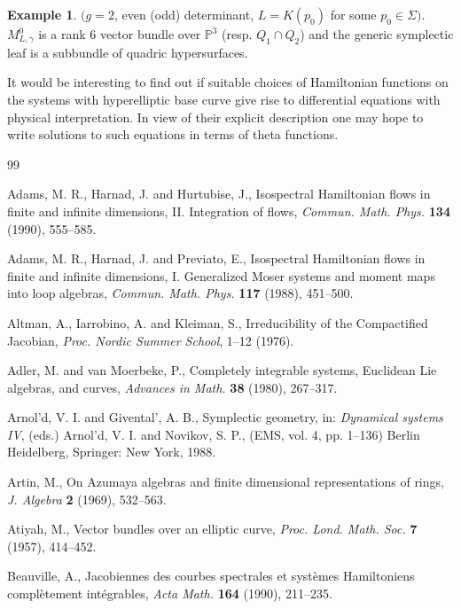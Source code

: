 \documentclass[12pt,a4paper,oneside,english]{smfart}
\theoremstyle{definition}
\newtheorem{exmp}[thm]{Example}
\theoremstyle{remark}
\begin{document}
\begin{exmp}\label{t9.16}
$(g = 2$, even (odd) determinant, $L = K(p_0)$ for some $p_0 \in \Sigma)$. $M^0_{L, \gamma}$ is a rank 6 vector bundle over $\mathbb{P}^3$ (resp. $Q_1 \cap Q_2$) and the generic symplectic leaf is a subbundle of quadric hypersurfaces.
\end{exmp}

It would be interesting to find out if suitable choices of Hamiltonian functions on the systems with hyperelliptic base curve give rise to differential equations with physical interpretation. In view of their explicit description one may hope to write solutions to such equations in terms of theta functions.

\begin{thebibliography}{99}

 Adams, M. R., Harnad, J. and Hurtubise, J., Isospectral Hamiltonian flows in finite and infinite dimensions, II. Integration of flows, \emph{Commun. Math. Phys.} \textbf{134} (1990), 555--585.

 Adams, M. R., Harnad, J. and Previato, E., Isospectral Hamiltonian flows in finite and infinite dimensions, I. Generalized Moser systems and moment maps into loop algebras, \emph{Commun. Math. Phys.} \textbf{117} (1988), 451--500.

 Altman, A., Iarrobino, A. and Kleiman, S., Irreducibility of the Compactified Jacobian, \emph{Proc. Nordic Summer School}, 1--12 (1976).

 Adler, M. and van Moerbeke, P., Completely integrable systems, Euclidean Lie algebras, and curves, \emph{Advances in Math.} \textbf{38} (1980), 267--317.

 Arnol'd, V. I. and Givental', A. B., Symplectic geometry, in: \emph{Dynamical systems IV}, (eds.) Arnol'd, V. I. and Novikov, S. P., (EMS, vol. 4, pp. 1--136) Berlin Heidelberg, Springer: New York, 1988.

 Artin, M., On Azumaya algebras and finite dimensional representations of rings, \emph{J. Algebra} \textbf{2} (1969), 532--563.

 Atiyah, M., Vector bundles over an elliptic curve, \emph{Proc. Lond. Math. Soc.} \textbf{7} (1957), 414--452.

 Beauville, A., Jacobiennes des courbes spectrales et syst\`emes Hamiltoniens compl\`etement int\'egrables, \emph{Acta Math.} \textbf{164} (1990), 211--235.


\end{thebibliography}
\end{document}
